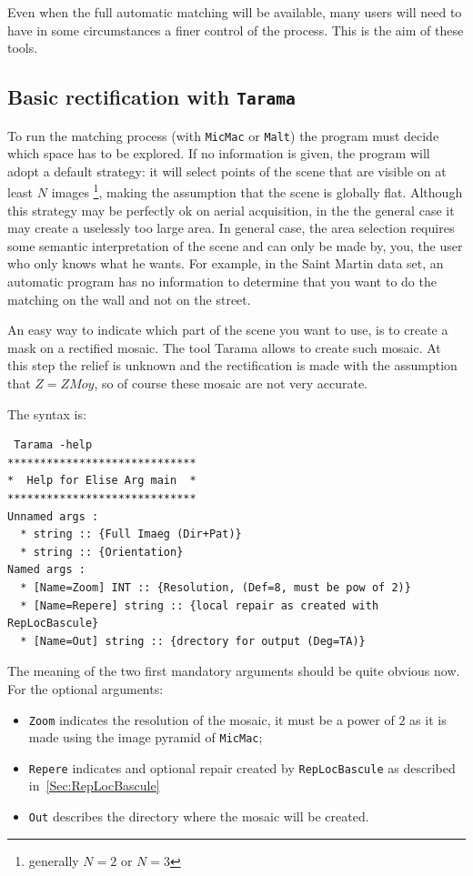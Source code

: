 \label{SemiAutoMatch}

Even when the full automatic matching will be available, many users will need to have
in some circumstances a finer control of the process. This is the aim of these tools.

\subsection{Basic rectification with {\tt Tarama}}

\label{Sec:Tarama}

To run the matching process (with {\tt MicMac} or {\tt Malt}) the
program must decide which space has to be explored. If no
information is given, the program will adopt a default strategy: it
will select points of the scene that are visible on at least $N$ images
\footnote{generally $N=2$ or $N=3$}, 
making the assumption that the scene is globally flat. Although this
strategy may be perfectly ok on aerial acquisition, in the the general
case it may create a uselessly too large area. In general case, the
area selection requires some semantic interpretation of the scene
and can only be made by, you, the user who only knows what he wants.
For example, in the Saint Martin data set, an automatic program has no
information to determine that you want to do the matching on the wall
and not on the street.

An easy way to indicate which part of the scene you want to use,
is to create a mask on a rectified mosaic. The tool Tarama allows
to create such mosaic. At this step the relief is unknown and the 
rectification is made with the assumption that $Z=ZMoy$, so of
course these mosaic are not very accurate.

The syntax is:

\begin{verbatim}
 Tarama -help
*****************************
*  Help for Elise Arg main  *
*****************************
Unnamed args : 
  * string :: {Full Imaeg (Dir+Pat)}
  * string :: {Orientation}
Named args : 
  * [Name=Zoom] INT :: {Resolution, (Def=8, must be pow of 2)}
  * [Name=Repere] string :: {local repair as created with RepLocBascule}
  * [Name=Out] string :: {drectory for output (Deg=TA)}
\end{verbatim}

The meaning of the two first mandatory arguments should be quite obvious now.
For the optional arguments:

\begin{itemize}
   \item  {\tt Zoom} indicates the resolution of the mosaic, it must be a power
          of $2$ as it is made using the image pyramid of {\tt MicMac};

   \item  {\tt Repere} indicates and optional repair created by {\tt RepLocBascule}
          as described in~\ref{Sec:RepLocBascule}
   \item {\tt Out} describes the directory where the mosaic will be created.
\end{itemize}

